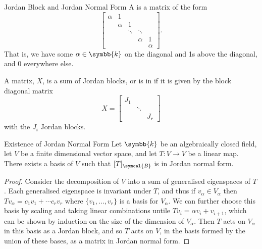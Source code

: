 \documentclass[fleqn]{NotesClass}
\renewcommand{\field}{\symbb{k}}
\begin{document}
    \begin{dfn}{Jordan Block and Jordan Normal Form}{}
        A  is a matrix of the form
        \begin{equation}
            \begin{bmatrix}
                \alpha & 1 \\
                & \alpha & 1 \\
                & & \ddots & \ddots\\
                & & & \alpha & 1\\
                & & & & \alpha
            \end{bmatrix}
            .
        \end{equation}
        That is, we have some \(\alpha \in \field\) on the diagonal and 1s above the diagonal, and 0 everywhere else.
        
        A matrix, \(X\), is a sum of Jordan blocks, or is in  if it is given by the block diagonal matrix
        \begin{equation}
            X = 
            \begin{bmatrix}
                J_1\\
                & \ddots \\
                & & J_r
            \end{bmatrix}
        \end{equation}
        with the \(J_i\) Jordan blocks.
    \end{dfn}
    
    \begin{crl}{Existence of Jordan Normal Form}{}
        Let \(\field\) be an algebraically closed field, let \(V\) be a finite dimensional vector space, and let \(T \colon V \to V\) be a linear map.
        There exists a basis of \(V\) such that \([T]_{\symcal{B}}\) is in Jordan normal form.
        \begin{proof}
            Consider the decomposition of \(V\) into a sum of generalised eigenspaces of \(T\).
            Each generalised eigenspace is invariant under \(T\), and thus if \(v_\alpha \in V_\alpha\) then \(Tv_\alpha = c_1v_1 + \dotsb c_rv_r\) where \(\{v_1, \dotsc, v_r\}\) is a basis for \(V_\alpha\).
            We can further choose this basis by scaling and taking linear combinations untile \(Tv_{i} = \alpha v_i + v_{i+1}\), which can be shown by induction on the size of the dimension of \(V_\alpha\).
            Then \(T\) acts on \(V_\alpha\) in this basis as a Jordan block, and so \(T\) acts on \(V\), in the basis formed by the union of these bases, as a matrix in Jordan normal form.
        \end{proof}
    \end{crl}
    
\end{document}
